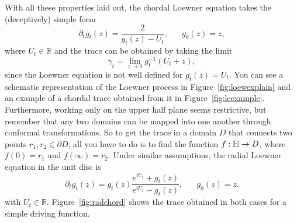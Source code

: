 With all these properties laid out, the chordal Loewner equation takes the
(deceptively) simple form
\begin{equation}
    \label{eq:loew}
    \partial_t g_t(z) = \frac{2}{g_t(z) - U_t}
    ,\,\,\,\,\,\,\,\,\,\,
    g_0(z)=z,
\end{equation}
where $U_t\in\mathbb{R}$ and the trace can be obtained by taking the limit
\begin{equation}
    \gamma_t = \lim_{z\rightarrow 0}g_t^{-1}\left(U_t + z\right),
\end{equation}
since the Loewner equation is not well defined for $g_t(z)=U_t$. You can see a
schematic representation of the Loewner process in Figure~\ref{fig:loewexplain}
and an example of a chordal trace obtained from it in
Figure~\ref{fig:leexample}. Furthermore, working only on the upper half plane
seems restrictive, but remember that any two domains can be mapped into one
another through conformal transformations. So to get the trace in a domain $D$
that connects two points $r_1, r_2 \in \partial D$, all you have to do is to
find the function $f:\mathbb{H}\rightarrow D$, where $f(0)=r_1$ and $f(\infty)=r_2$.
Under similar assumptions, the radial Loewner equation in the unit disc is
\begin{equation}
    \partial_{t}g_{t}\left(z\right)=
    g_{t}\left(z\right)
    \frac{e^{iU_{t}}+g_{t}\left(z\right)}
         {e^{iU_{t}}-g_{t}\left(z\right)}
    ,\,\,\,\,\,\,\,\,\,\,
    g_0(z)=z.
\end{equation}
with $U_t\in\mathbb{R}$. Figure~\ref{fig:radchord} shows the trace
obtained in both cases for a simple driving function.

